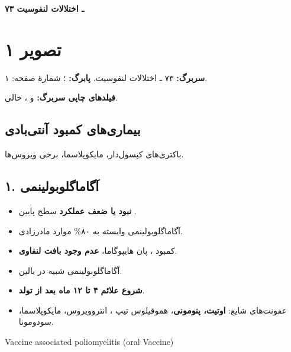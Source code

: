 \documentclass[12pt,a4paper]{article}
\begin{document}
\fi
\begingroup
\newcommand{\LDarrow}{\lr{\(\longleftarrow\)}}
\newcommand{\LDrange}[2]{\lr{#1--#2}}
\newcommand{\LDunclear}[1]{\textbf{[خوانش نامطمئن: #1]}}
\newcommand{\LDpage}[1]{\clearpage\section*{تصویر #1}
\textbf{سربرگ:} ۷۳ ـ اختلالات لنفوسیت.
\textbf{پابرگ:} \lr{GNOTE}؛ شمارهٔ صفحه: #1.
\par\textbf{فیلدهای چاپی سربرگ:} \lr{Date:} و \lr{Subject:}، خالی.}

\begin{center}
{\Large\bfseries ۷۳ ـ اختلالات لنفوسیت}
\end{center}
\section*{تصویر ۱}
\textbf{سربرگ:} ۷۳ ـ اختلالات لنفوسیت.
\textbf{پابرگ:} ؛ شمارهٔ صفحه: ۱.
\par\textbf{فیلدهای چاپی سربرگ:}  و ، خالی.

\subsection*{بیماری‌های کمبود آنتی‌بادی}
باکتری‌های کپسول‌دار، مایکوپلاسما، برخی ویروس‌ها.

\subsection*{۱. آگاماگلوبولینمی}
\begin{itemize}
\item \textbf{نبود یا ضعف عملکرد } \LDarrow{} سطح پایین .
\item آگاماگلوبولینمی وابسته به  \LDarrow{} ۸۰\% موارد مادرزادی.
\item کمبود ، پان هایپوگاما، \textbf{عدم وجود بافت لنفاوی}.
\item آگاماگلوبولینمی  \LDarrow{} شبیه  در بالین.
\item \textbf{شروع علائم ۴ تا ۱۲ ماه بعد از تولد}.
\item عفونت‌های شایع: \textbf{اوتیت، پنومونی}، هموفیلوس تیپ ،
انتروویروس، مایکوپلاسما، سودومونا.
\end{itemize}
\begin{latin}
Vaccine associated poliomyelitis (oral Vaccine)
\end{latin}
\end{document}
